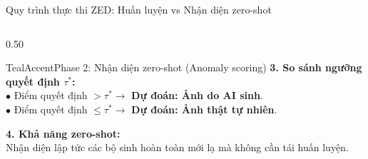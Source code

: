 \documentclass[aspectratio=169, 10pt, t]{beamer}
\begin{document}
\begin{frame}{Quy trình thực thi ZED: Huấn luyện vs Nhận diện zero-shot}
\begin{columns}[t]
\begin{column}{0.50\textwidth}
\begin{accentbox}[equal height group=pipeexec]{TealAccent}{Phase 2: Nhận diện zero-shot (Anomaly scoring)}
        \textbf{3. So sánh ngưỡng quyết định $\tau^*$:}\\
        $\bullet$ Điểm quyết định $> \tau^* \longrightarrow$ \textbf{\textcolor{CrimsonCoral}{Dự đoán: Ảnh do AI sinh}}.\\
        $\bullet$ Điểm quyết định $\le \tau^* \longrightarrow$ \textbf{\textcolor{EmeraldGreen}{Dự đoán: Ảnh thật tự nhiên}}.
        \vspace{0.18em}

        \textbf{4. Khả năng zero-shot:}\\
        Nhận diện lập tức các bộ sinh hoàn toàn mới lạ mà không cần tái huấn luyện.
      \end{accentbox}
    \end{column}
  \end{columns}
\end{frame}
\end{document}
